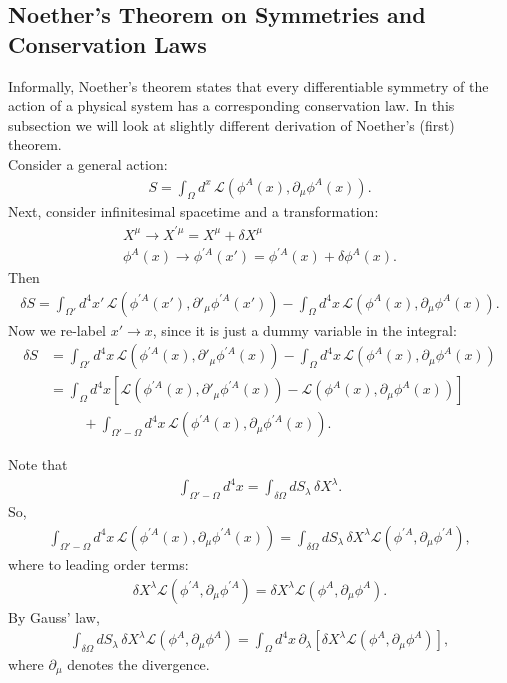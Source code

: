 \documentclass[a4paper,11pt]{article}
\numberwithin{equation}{section}
\theoremstyle{definition}
\newcommand{\p}{\partial}
\newcommand{\lag}{\mathcal{L}}
\begin{document}
\subsection{Noether's Theorem on Symmetries and Conservation Laws}

Informally, Noether's theorem states that every differentiable symmetry of the action of a physical system has a corresponding conservation law. In this subsection we will look at slightly different derivation of Noether's (first) theorem.\\

Consider a general action:
\begin{align}
S = \int_\Omega d^x\, \lag\left( \phi^A(x), \p_\mu \phi^A(x)\right).
\end{align}
Next, consider infinitesimal spacetime and a transformation:
\begin{align}
X^\mu \to X^{'\mu} = X^\mu + \delta X^\mu \nonumber \\
\phi^A(x) \to \phi^{'A}(x') = \phi^{'A}(x) + \delta \phi^{A}(x).
\end{align}
Then
\begin{align}
\delta S = \int_{\Omega'} d^4x'\, \lag\left( \phi^{'A}(x'), \p'_\mu \phi^{'A}(x') \right) - \int_\Omega d^4x\, \lag\left( \phi^A(x), \p_\mu \phi^A(x)\right).
\end{align}
Now we re-label $x' \to x$, since it is just a dummy variable in the integral:
\begin{align}
\delta S &= \int_{\Omega'} d^4x\, \lag\left( \phi^{'A}(x), \p'_\mu \phi^{'A}(x) \right) - \int_\Omega d^4x\, \lag\left( \phi^A(x), \p_\mu\phi^A(x)\right)\nonumber\\
&= \int_\Omega d^4x\left[\lag\left( \phi^{'A}(x), \p'_\mu \phi^{'A}(x) \right) - \lag\left( \phi^A(x), \p_\mu\phi^A(x)\right)\right] \nonumber\\
&\hspace{1cm} + \int_{\Omega' - \Omega} d^4x\, \lag\left(\phi^{'A}(x), \p_\mu\phi^{'A}(x) \right).
\end{align}

Note that
\begin{align}
\int_{\Omega'-\Omega}d^4x = \int_{\delta \Omega} dS_\lambda\,\delta X^\lambda.
\end{align}
So,
\begin{align}
\int_{\Omega' - \Omega} d^4x\, \lag\left(\phi^{'A}(x), \p_\mu\phi^{'A}(x) \right) = \int_{\delta \Omega} dS_\lambda\, \delta X^\lambda \lag\left(\phi^{'A}, \p_\mu \phi^{'A}\right),
\end{align}
where to leading order terms:
\begin{align}
\delta X^\lambda \lag\left(\phi^{'A}, \p_\mu \phi^{'A}\right) = \delta X^\lambda \lag\left(\phi^A, \p_\mu\phi^A\right).
\end{align}
By Gauss' law, 
\begin{align}
\int_{\delta \Omega} dS_\lambda\, \delta X^\lambda \lag\left(\phi^A, \p_\mu \phi^A \right)  = \int_\Omega d^4x\,\p_\lambda \left[ \delta X^\lambda \lag\left(\phi^A, \p_\mu\phi^A\right)\right],
\end{align}
where $\p_\mu$ denotes the divergence.\\
\end{document}
